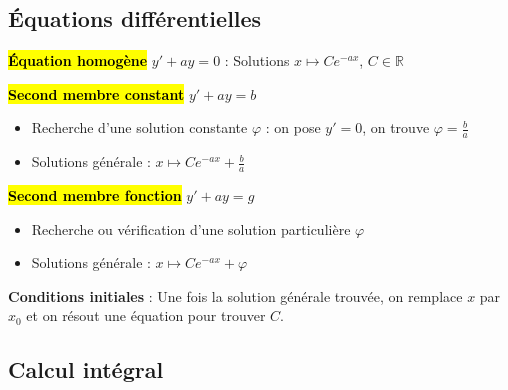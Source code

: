 \documentclass[10pt,fleqn, openany, landscape, twocolumn]{book} %
\begin{document}

\subsection*{Équations différentielles}

\hl{\textbf{Équation homogène}} $y'+ay=0$ : Solutions $x\mapsto Ce^{-ax}$, $C\in\mathbb{R}$

\hl{\textbf{Second membre constant}} $y'+ay=b$
\begin{itemize}
\item Recherche d'une solution constante $\varphi$ : on pose $y'=0$, on trouve $\varphi=\frac{b}{a}$
\item Solutions générale : $x\mapsto Ce^{-ax}+\frac{b}{a}$
\end{itemize}

\hl{\textbf{Second membre fonction}} $y'+ay=g$
\begin{itemize}
\item Recherche ou vérification d'une solution particulière $\varphi$
\item Solutions générale : $x\mapsto Ce^{-ax}+\varphi$
\end{itemize}

\textbf{Conditions initiales} : Une fois la solution générale trouvée, on remplace $x$ par $x_0$ et on résout une équation pour trouver $C$.

\subsection*{Calcul intégral}
\end{document}
